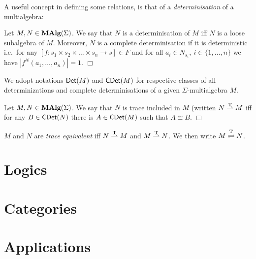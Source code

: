 A useful concept in defining some relations, is that of a {\em
determinisation\/} of a multialgebra:

\begin{Definition}
Let $M,N \in \mbox{\rm\bf MAlg}(\Sigma)$. We say that $N$ is a determinisation of
$M$ iff $N$ is a loose subalgebra of $M$. Moreover, $N$ is a complete
determinisation if it is deterministic i.e.\ for any $[f : s_1 \times
s_2 \times \ldots \times s_n \rightarrow s] \in F$ and for all $a_i
\in N_{s_i},\ i \in \{1,\ldots,n\}$ we have $|f^N(a_1,\ldots,a_n)| =
1.$ 
\hfill$\Box$
\end{Definition}
%
We adopt notations $\mbox{\sf Det}(M)$ and $\mbox{\sf CDet}(M)$ for respective classes of
all determinizations and complete determinisations of a given
$\Sigma$-multialgebra $M$. 

\begin{Definition}
Let $M,N \in \mbox{\rm\bf MAlg}(\Sigma)$. We say that $N$ is trace included in $M$
(written $N \stackrel{\rm T}{\rightharpoonup} M$ iff for any $B \in \mbox{\sf CDet}(N)$ there is $A \in
\mbox{\sf CDet}(M)$ such that $A \cong B$.  
\hfill$\Box$
\end{Definition}
%
$M$ and $N$ are {\em trace equivalent\/} iff $N \stackrel{\rm T}{\rightharpoonup} M$ and $M
\stackrel{\rm T}{\rightharpoonup} N$. We then write $M \stackrel{\rm T}{\rightleftharpoons} N$.

%
%
\section{Logics}


%
%
\section{Categories}


%
%
\section{Applications}


